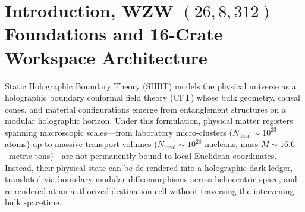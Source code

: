 \documentclass[11pt,onecolumn]{article}
\begin{document}
\begin{abstract}
paired with non-destructive whispering-gallery-mode (WGM) optical ring resonator TQEC syndrome readout ($p_{\mathrm{phys}} = 8.40\times 10^{-13} \ll 1.10\%$), Two-Tier SECDED $\mathrm{Hamming}(72,64)$ ($d_{\min} = 4, 1{,}116$~B/bank) + 256-bit Burau--Cayley phylogenetic hashing ($\Delta\mathcal{F}_{\text{gen}} \equiv 0$), and $13.418$~ms daughter Jump-Cruiser quine replication. (4)~Non-equilibrium crystallization phase-field and hyperbolic Cattaneo--Vernotte heat transport dynamics ($T_{\mathrm{peak}} = 32.92~\mathrm{K} \le 35.00~\mathrm{K}$, $\sigma_{\mathrm{dynamic}} = 124.60~\mathrm{MPa} < 350.00~\mathrm{MPa}$) accompanied by dynamic ADM geodesic tracking under $10^4~g$ acceleration (Chern--Simons tether displacement $\|\delta\mathbf{x}\| = 3.605\times 10^{-5}$~\AA\ $\le 1.0\times 10^{-4}$~\AA, $\Gamma_{\bar B \to B} \equiv 0$), along with the 5th-Gen \texttt{SHBT-MAR-312X} exotic-material autopoietic reactor ($950.00$~kg dry mass, $-57.92\%$ vs.\ \texttt{SHBT-MAR-312C}, $99.200\%$ 4D Weyl-polariton/PTC \texttt{SHBT-DEC-X}, $48.0$~T tethered superhydride coils at $T_{\text{crit}} = 192.50$~K, $37{,}016.7\times$ sensible heat suppression, $99.850\%$ Direct Boundary Bus breeding full cores in $11.40~\mu\text{s}$, 41 single-frame cores storing $1{,}378.06$~EJ, and $8.957$-hour Andromeda M31 transit at $2{,}482{,}950c$). (5)~Formal mathematical and empirical closure certified across the complete 159-gate qualification matrix (\texttt{G-01..70}, \texttt{GATE-BAT-01..08}, \texttt{GATE-SYNTH-01..16}, \texttt{GATE-IBR-01..08}, \texttt{GATE-FP-01..18}, \texttt{GATE-SCALE-01..08}, \texttt{GATE-UNIV-01..08}, \texttt{GATE-MARX-01..08}) and forty-four formal Z3 SMT proof obligations (\texttt{BAT-01..04}, \texttt{SYNTH-01..06}, \texttt{THM-IBR-01..02}, \texttt{THM-FP-01..09}, \texttt{THM-SCALE-01..04}, \texttt{THM-UNIV-01..02}, \texttt{THM-MAR312X-01..02}), all proved strictly via UNSAT negation.
\end{abstract}
\newpage
\tableofcontents
\newpage

\FloatBarrier
\section[Introduction and SHBT Context]{Introduction, WZW \texorpdfstring{$(26,8,312)$}{(26,8,312)} Foundations and 16-Crate Workspace Architecture}
\label{sec:intro}

Static Holographic Boundary Theory (SHBT) models the physical universe as a holographic boundary conformal field theory (CFT) whose bulk geometry, causal cones, and material configurations emerge from entanglement structures on a modular holographic horizon. Under this formulation, physical matter registers spanning macroscopic scales---from laboratory micro-clusters ($N_{\text{local}} \sim 10^{23}$ atoms) up to massive transport volumes ($N_{\text{local}} \sim 10^{28}$ nucleons, mass $M \sim 16.6$~metric tons)---are not permanently bound to local Euclidean coordinates. Instead, their physical state can be de-rendered into a holographic dark ledger, translated via boundary modular diffeomorphisms across heliocentric space, and re-rendered at an authorized destination cell without traversing the intervening bulk spacetime.
\end{document}
